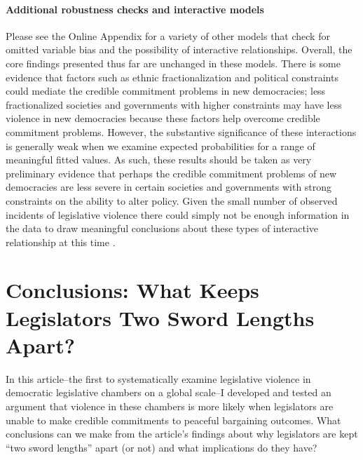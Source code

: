 \documentclass[a4paper]{article}\usepackage[]{graphicx}\usepackage[]{color}
\begin{document}
\paragraph{Additional robustness checks and interactive models}

Please see the Online Appendix for a variety of other models that check for omitted variable bias and the possibility of interactive relationships. Overall, the core findings presented thus far are unchanged in these models. There is some evidence that factors such as ethnic fractionalization and political constraints could mediate the credible commitment problems in new democracies; less fractionalized societies and governments with higher constraints may have less violence in new democracies because these factors help overcome credible commitment problems. However, the substantive significance of these interactions is generally weak when we examine expected probabilities for a range of meaningful fitted values. As such, these results should be taken as very preliminary evidence that perhaps the credible commitment problems of new democracies are less severe in certain societies and governments with strong constraints on the ability to alter policy. Given the small number of observed incidents of legislative violence there could simply not be enough information in the data to draw meaningful conclusions about these types of interactive relationship at this time \citep[]{Brambor2006}.

\section*{Conclusions: What Keeps Legislators Two Sword Lengths Apart?}

In this article--the first to systematically examine legislative violence in democratic legislative chambers on a global scale--I developed and tested an argument that violence in these chambers is more likely when legislators are unable to make credible commitments to peaceful bargaining outcomes. What conclusions can we make from the article's findings about why legislators are kept ``two sword lengths'' apart (or not) and what implications do they have?
\end{document}
